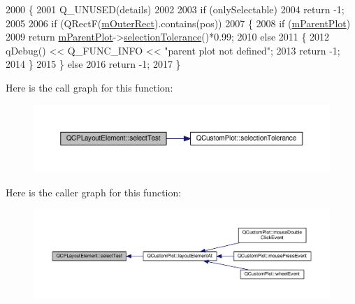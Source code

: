 \begin{DoxyCode}
2000 \{
2001   Q\_UNUSED(details)
2002   
2003   if (onlySelectable)
2004     return -1;
2005   
2006   if (QRectF(\hyperlink{class_q_c_p_layout_element_a07bb4973379e75cb0fa5b032c1d24afd}{mOuterRect}).contains(pos))
2007   \{
2008     \textcolor{keywordflow}{if} (\hyperlink{class_q_c_p_layerable_aa2a528433e44db02b8aef23c1f9f90ed}{mParentPlot})
2009       \textcolor{keywordflow}{return} \hyperlink{class_q_c_p_layerable_aa2a528433e44db02b8aef23c1f9f90ed}{mParentPlot}->\hyperlink{class_q_custom_plot_a7b738074c75e80070ef6a10263c6cd69}{selectionTolerance}()*0.99;
2010     \textcolor{keywordflow}{else}
2011     \{
2012       qDebug() << Q\_FUNC\_INFO << \textcolor{stringliteral}{"parent plot not defined"};
2013       \textcolor{keywordflow}{return} -1;
2014     \}
2015   \} \textcolor{keywordflow}{else}
2016     \textcolor{keywordflow}{return} -1;
2017 \}
\end{DoxyCode}


Here is the call graph for this function\+:\nopagebreak
\begin{figure}[H]
\begin{center}
\leavevmode
\includegraphics[width=350pt]{class_q_c_p_layout_element_a9fcf5d0ea19f2c23b2b528bce2c6f095_cgraph}
\end{center}
\end{figure}




Here is the caller graph for this function\+:\nopagebreak
\begin{figure}[H]
\begin{center}
\leavevmode
\includegraphics[width=350pt]{class_q_c_p_layout_element_a9fcf5d0ea19f2c23b2b528bce2c6f095_icgraph}
\end{center}
\end{figure}


